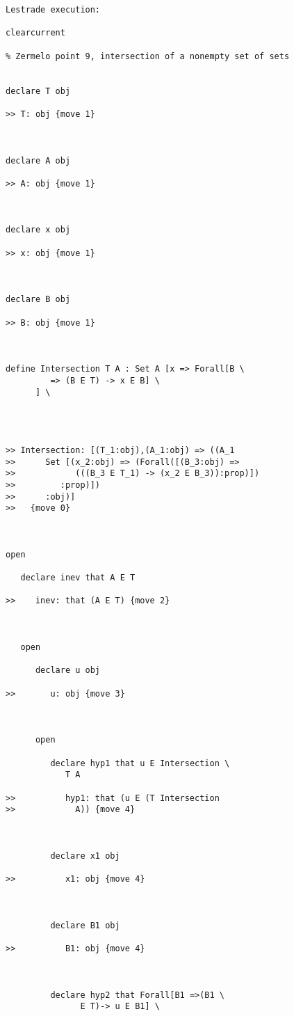 \documentclass[12pt]{article}
\begin{document}
\begin{verbatim}Lestrade execution:

clearcurrent

% Zermelo point 9, intersection of a nonempty set of sets


declare T obj

>> T: obj {move 1}



declare A obj

>> A: obj {move 1}



declare x obj

>> x: obj {move 1}



declare B obj

>> B: obj {move 1}



define Intersection T A : Set A [x => Forall[B \
         => (B E T) -> x E B] \
      ] \
   



>> Intersection: [(T_1:obj),(A_1:obj) => ((A_1
>>      Set [(x_2:obj) => (Forall([(B_3:obj) =>
>>            (((B_3 E T_1) -> (x_2 E B_3)):prop)])
>>         :prop)])
>>      :obj)]
>>   {move 0}



open

   declare inev that A E T

>>    inev: that (A E T) {move 2}



   open

      declare u obj

>>       u: obj {move 3}



      open

         declare hyp1 that u E Intersection \
            T A

>>          hyp1: that (u E (T Intersection
>>            A)) {move 4}



         declare x1 obj

>>          x1: obj {move 4}



         declare B1 obj

>>          B1: obj {move 4}



         declare hyp2 that Forall[B1 =>(B1 \
               E T)-> u E B1] \
            




\end{verbatim}
\end{document}
